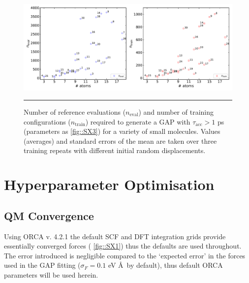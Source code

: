 \documentclass[11pt]{article}
\numberwithin{equation}{subsection}
\newcommand{\tacc}{$\tau_\text{acc}$}
\begin{document}
\begin{figure}[h!]
	\centering
	\vspace{0.4cm}
	\includegraphics[width=\textwidth]{figSX5.pdf}
	\hrule
	\vspace{0.1cm}
	\caption{Number of reference evaluations ($n_\text{eval}$) and number of training configurations ($n_\text{train}$) required to generate a GAP with \tacc $>1$ ps (parameters as \figurename{ \ref{fig::SX3}}) for a variety of small molecules. Values (averages) and standard errors of the mean are taken over three training repeats with different initial random displacements.}
	\label{fig::SX5}
\end{figure}



\clearpage
\section{Hyperparameter Optimisation}
\label{section::hyperparam_opt}

\subsection{QM Convergence}


Using ORCA v. 4.2.1 the default SCF and DFT integration grids provide essentially converged forces (\figurename{ \ref{fig::SX1}}) thus the defaults are used throughout. The error introduced is negligible compared to the `expected error' in the forces used in the GAP fitting ($\sigma_F = 0.1$ eV \AA~by default), thus default ORCA parameters will be used herein.
\end{document}
